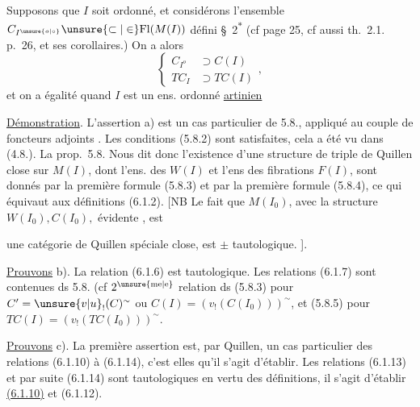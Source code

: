 
 Supposons que $I$ soit   
ordonné, et considérons l'ensemble
$C_{I^{\unsure{o|\circ}}}\unsure{\subset|\in}\mathrm{Fl}(M(I))$ défini   \S~2\textsuperscript{$*$}
(cf page 25, cf aussi th.~2.1. p.~26,  et
ses corollaires.) On a alors
\[
\left\{\begin{aligned}
 C_{I^{o}}&\supset C(I)\\
 TC_{I}&\supset TC(I)
\end{aligned}\right.,\tag*{(6.1.15)}
\]
et on a égalité quand $I$ est  un
ens. ordonné \uline{artinien}

\uline{Démonstration}. L'assertion a) est un
cas particulier de 5.8., appliqué au
couple de foncteurs adjoints
.
Les conditions (5.8.2) sont satisfaites,
cela a été vu dans (4.8.). La prop.~5.8.
Nous dit donc l'existence d'une
structure de triple de Quillen close
sur $M(I)$, dont l'ens. des  
$W(I)$ et l'ens des fibrations $F(I)$, sont
donnés par la première formule (5.8.3)
et par la première formule (5.8.4),
ce qui équivaut aux définitions (6.1.2).
[NB Le fait que $M(I_{0})$, avec la
structure $W(I_{0}),C(I_{0}),$ évidente , est


 une catégorie de Quillen spéciale close, est
$\pm$ tautologique. ].

\uline{Prouvons} b). La relation (6.1.6) est
tautologique. Les relations (6.1.7) sont
contenues ds 5.8. (cf $2^{\unsure{\mathrm{me}|\mathrm{e}}}$ relation
ds (5.8.3) pour $C'=\unsure{v|u}_{!}(C)^{\sim}$ ou
$C(I)=(v_{!}(C(I_{0})))^{\sim}$, et (5.8.5) pour
$TC(I)=(v_{!}(TC(I_{0})))^{\sim}$.

\uline{Prouvons} c). La première assertion
est, par Quillen, un cas particulier
des relations (6.1.10) à (6.1.14), c'est
elles qu'il s'agit d'établir. Les relations
(6.1.13) et par suite (6.1.14) sont
tautologiques en vertu des définitions,
 il s'agit d'établir \uline{(6.1.10)}
et (6.1.12).

